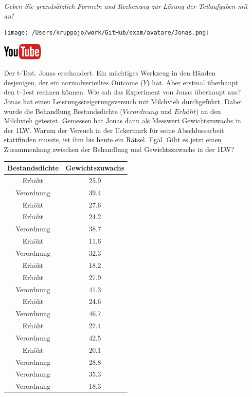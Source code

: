 \documentclass[a4paper, 9pt]{scrartcl}\usepackage[]{graphicx}\usepackage[]{xcolor}
\begin{document}
\textit{Geben Sie grundsätzlich Formeln und Rechenweg zur Lösung der Teilaufgaben mit an!} \\[1Ex]
 

 
\begin{minipage}[t]{0.5\textwidth}
\texttt{[image: /Users/kruppajo/work/GitHub/exam/avatare/Jonas.png]}
\end{minipage}
\begin{minipage}[t]{0.5\textwidth}
\hfill
\href{https://youtu.be/Cq_rF_z4xOk}{\includegraphics[width = 2cm]{img/youtube}}\\[1Ex]
\end{minipage}
\vspace{1ex}



Der t-Test. Jonas erschaudert. Ein mächtiges Werkzeug in den Händen desjenigen, der ein normalverteiltes Outcome ($Y$) hat. Aber erstmal überhaupt den t-Test rechnen können. Wie sah das Experiment von Jonas überhaupt aus? Jonas hat einen Leistungssteigerungsversuch mit Milchvieh durchgeführt. Dabei wurde die Behandlung Bestandsdichte ($Verordnung$ und $Erhöht$) an den Milchvieh getestet. Gemessen hat Jonas dann als Messwert Gewichtszuwachs in der 1LW. Warum der Versuch in der Uckermark für seine Abschlussarbeit stattfinden musste, ist ihm bis heute ein Rätsel. Egal. Gibt es jetzt einen Zusammenhang zwischen der Behandlung und Gewichtszuwachs in der 1LW?

\begin{table}[!h]
\centering
\begin{tabular}{cc}
\toprule
Bestandsdichte & Gewichtszuwachs\\
\midrule
Erhöht & 25.9\\
Verordnung & 39.4\\
Erhöht & 27.6\\
Erhöht & 24.2\\
Verordnung & 38.7\\
\addlinespace
Erhöht & 11.6\\
Verordnung & 32.3\\
Erhöht & 18.2\\
Erhöht & 27.9\\
Verordnung & 41.3\\
\addlinespace
Erhöht & 24.6\\
Verordnung & 46.7\\
Erhöht & 27.4\\
Verordnung & 42.5\\
Erhöht & 20.1\\
\addlinespace
Verordnung & 28.8\\
Verordnung & 35.3\\
Verordnung & 18.3\\
\bottomrule
\end{tabular}
\end{table}
\end{document}
